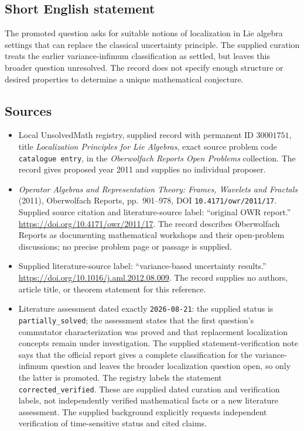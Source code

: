 \documentclass[11pt]{article}
\begin{document}
\subsection{Short English statement}
The promoted question asks for suitable notions of localization in Lie algebra settings that can replace the classical uncertainty principle. The supplied curation treats the earlier variance-infimum classification as settled, but leaves this broader question unresolved. The record does not specify enough structure or desired properties to determine a unique mathematical conjecture.
\subsection{Sources}
\begin{itemize}
\item Local UnsolvedMath registry, supplied record with permanent ID \(30001751\), title \emph{Localization Principles for Lie Algebras}, exact source problem code \texttt{catalogue entry}, in the \emph{Oberwolfach Reports Open Problems} collection. The record gives proposed year 2011 and supplies no individual proposer.
\item \emph{Operator Algebras and Representation Theory: Frames, Wavelets and Fractals} (2011), Oberwolfach Reports, pp.~901--978, DOI \texttt{10.4171/owr/2011/17}. Supplied source citation and literature-source label: ``original OWR report.'' \url{https://doi.org/10.4171/owr/2011/17}. The record describes Oberwolfach Reports as documenting mathematical workshops and their open-problem discussions; no precise problem page or passage is supplied.
\item Supplied literature-source label: ``variance-based uncertainty results.'' \url{https://doi.org/10.1016/j.aml.2012.08.009}. The record supplies no authors, article title, or theorem statement for this reference.
\item Literature assessment dated exactly \texttt{2026-08-21}: the supplied status is \texttt{partially\_solved}; the assessment states that the first question's commutator characterization was proved and that replacement localization concepts remain under investigation. The supplied statement-verification note says that the official report gives a complete classification for the variance-infimum question and leaves the broader localization question open, so only the latter is promoted. The registry labels the statement \texttt{corrected\_verified}. These are supplied dated curation and verification labels, not independently verified mathematical facts or a new literature assessment. The supplied background explicitly requests independent verification of time-sensitive status and cited claims.
\end{itemize}
\end{document}
